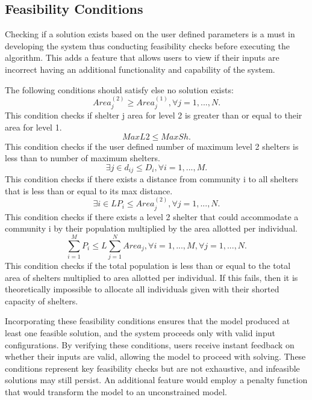 	
	
\subsection{Feasibility Conditions}

	Checking if a solution exists based on the user defined parameters is a must in developing the system thus conducting feasibility checks before executing the algorithm. This adds a feature that allows users to view if their inputs are incorrect having an additional functionality and capability of the system.
	
	The following conditions should satisfy else no solution exists:
	\begin{equation*} 
		\label{f1}
		Area_{j}^{(2)} \ge Area_{j}^{(1)}, \forall j = 1, ..., N.
	\end{equation*}
	This condition checks if shelter j area for level 2 is greater than or equal to their area for level 1. 
	\begin{equation*} 
		\label{f2}
		MaxL2 \le MaxSh.
	\end{equation*}
	This condition checks if the user defined number of maximum level 2 shelters is less than to number of maximum shelters.
	\begin{equation*} 
		\label{f3}
		\exists j \in d_{ij} \le D_{i}, \forall i = 1, ..., M.
	\end{equation*}
	This condition checks if there exists a distance from community i to all shelters that is less than or equal to its max distance.
	\begin{equation*} 
		\label{f4}
		\exists i \in LP_{i} \le Area_{j}^{(2)}, \forall j = 1, ..., N.
	\end{equation*}
	This condition checks if there exists a level 2 shelter that could accommodate a community i by their population multiplied by the area allotted per individual. 
	\begin{equation*} 
		\label{f5}
		\sum_{i=1}^{M}P_{i} \le L\sum_{j=1}^{N}Area_{j}, \forall i=1,...,M,  \forall j=1,...,N.
	\end{equation*}
	This condition checks if the total population is less than or equal to the total area of shelters multiplied to area allotted per individual. If this fails, then it is theoretically impossible to allocate all individuals given with their shorted capacity of shelters.
	
	Incorporating these feasibility conditions ensures that the model produced at least one feasible solution, and the system proceeds only with valid input configurations. By verifying these conditions, users receive instant feedback on whether their inputs are valid, allowing the model to proceed with solving. These conditions represent key feasibility checks but are not exhaustive, and infeasible solutions may still persist. An additional feature would employ a penalty function that would transform the model to an unconstrained model.	
	
